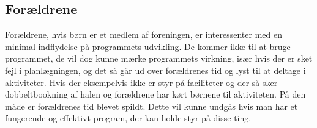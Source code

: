 
\subsection{Forældrene}
Forældrene, hvis børn er et medlem af foreningen, er interessenter med en minimal indflydelse på programmets udvikling. De kommer ikke til at bruge programmet, de vil dog kunne mærke programmets virkning, især hvis der er sket fejl i planlægningen, og det så går ud over forældrenes tid og lyst til at deltage i aktiviteter. Hvis der eksempelvis ikke er styr på faciliteter og der så sker dobbeltbookning af halen og forældrene har kørt børnene til aktiviteten. På den måde er forældrenes tid blevet spildt. Dette vil kunne undgås hvis man har et fungerende og effektivt program, der kan holde styr på disse ting.
\\
